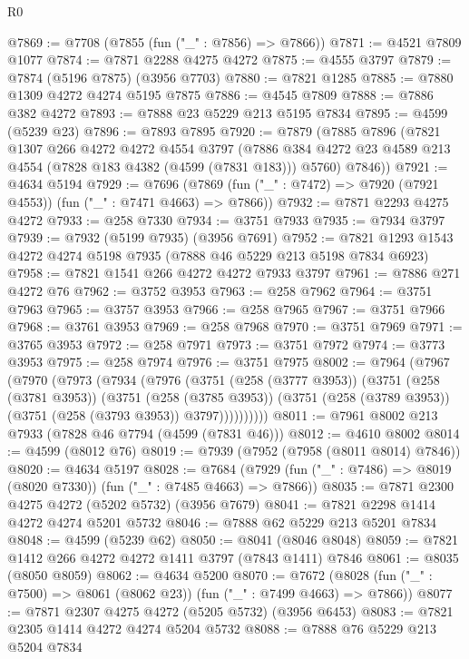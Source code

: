 \begin{lexlean}{R0}
\begin{coremodule}
@7869 := @7708 (@7855 (fun ("_" : @7856) => @7866))
@7871 := @4521 @7809 @1077
@7874 := @7871 @2288 @4275 @4272
@7875 := @4555 @3797
@7879 := @7874 (@5196 @7875) (@3956 @7703)
@7880 := @7821 @1285
@7885 := @7880 @1309 @4272 @4274 @5195 @7875
@7886 := @4545 @7809
@7888 := @7886 @382 @4272
@7893 := @7888 @23 @5229 @213 @5195 @7834
@7895 := @4599 (@5239 @23)
@7896 := @7893 @7895
@7920 := @7879
    (@7885
      @7896
      (@7821
        @1307
        @266
        @4272
        @4272
        @4554
        @3797
        (@7886 @384 @4272 @23 @4589 @213 @4554 (@7828 @183 @4382 (@4599 (@7831 @183))) @5760)
        @7846))
@7921 := @4634 @5194
@7929 := @7696 (@7869 (fun ("_" : @7472) => @7920 (@7921 @4553)) (fun ("_" : @7471 @4663) => @7866))
@7932 := @7871 @2293 @4275 @4272
@7933 := @258 @7330
@7934 := @3751 @7933
@7935 := @7934 @3797
@7939 := @7932 (@5199 @7935) (@3956 @7691)
@7952 := @7821 @1293 @1543 @4272 @4274 @5198 @7935 (@7888 @46 @5229 @213 @5198 @7834 @6923)
@7958 := @7821 @1541 @266 @4272 @4272 @7933 @3797
@7961 := @7886 @271 @4272 @76
@7962 := @3752 @3953
@7963 := @258 @7962
@7964 := @3751 @7963
@7965 := @3757 @3953
@7966 := @258 @7965
@7967 := @3751 @7966
@7968 := @3761 @3953
@7969 := @258 @7968
@7970 := @3751 @7969
@7971 := @3765 @3953
@7972 := @258 @7971
@7973 := @3751 @7972
@7974 := @3773 @3953
@7975 := @258 @7974
@7976 := @3751 @7975
@8002 := @7964
    (@7967
      (@7970
        (@7973
          (@7934
            (@7976
              (@3751
                (@258 (@3777 @3953))
                (@3751
                  (@258 (@3781 @3953))
                  (@3751
                    (@258 (@3785 @3953))
                    (@3751 (@258 (@3789 @3953)) (@3751 (@258 (@3793 @3953)) @3797))))))))))
@8011 := @7961 @8002 @213 @7933 (@7828 @46 @7794 (@4599 (@7831 @46)))
@8012 := @4610 @8002
@8014 := @4599 (@8012 @76)
@8019 := @7939 (@7952 (@7958 (@8011 @8014) @7846))
@8020 := @4634 @5197
@8028 := @7684 (@7929 (fun ("_" : @7486) => @8019 (@8020 @7330)) (fun ("_" : @7485 @4663) => @7866))
@8035 := @7871 @2300 @4275 @4272 (@5202 @5732) (@3956 @7679)
@8041 := @7821 @2298 @1414 @4272 @4274 @5201 @5732
@8046 := @7888 @62 @5229 @213 @5201 @7834
@8048 := @4599 (@5239 @62)
@8050 := @8041 (@8046 @8048)
@8059 := @7821 @1412 @266 @4272 @4272 @1411 @3797 (@7843 @1411) @7846
@8061 := @8035 (@8050 @8059)
@8062 := @4634 @5200
@8070 := @7672 (@8028 (fun ("_" : @7500) => @8061 (@8062 @23)) (fun ("_" : @7499 @4663) => @7866))
@8077 := @7871 @2307 @4275 @4272 (@5205 @5732) (@3956 @6453)
@8083 := @7821 @2305 @1414 @4272 @4274 @5204 @5732
@8088 := @7888 @76 @5229 @213 @5204 @7834

\end{coremodule}
\end{lexlean}
